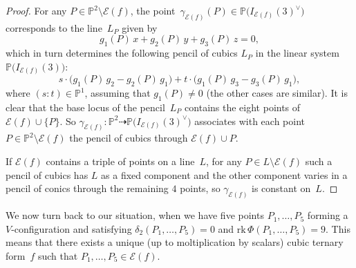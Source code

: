 \documentclass[a4paper, 11pt, reqno]{amsart}
\theoremstyle{plain}
\theoremstyle{definition}
\newcommand{\p}{\mathbb{P}}
\newcommand{\rk}{\ensuremath{\mathrm{rk}}}
\newcommand{\Eig}[1]{\mathcal{E}\!\left( {#1} \right)}
\begin{document}
\begin{proof}
%
For any $P \in \p^2 \setminus \Eig{f}$, the point~$\gamma_{\Eig{f}} (P)\in \p \bigl(I_{\Eig{f}}(3)^{\vee}\bigr)$ corresponds to the line~$L_P$ given by
\[
  g_1 (P) \, x + g_2(P) \, y + g_3(P) \, z = 0,
\]
%
which in turn determines the following
pencil of cubics $L_P$ in the linear system $\p \bigl(I_{\Eig{f}}(3)\bigr)$:
%
\[
  s \cdot \bigl( g_1(P) \, g_2 - g_2(P) \, g_1 \bigr) + t \cdot \bigl( g_1(P) \, g_3 - g_3(P) \, g_1 \bigr),
\]
%
where $(s: t) \in \p^1$, assuming that $g_1(P) \neq 0$ (the other cases are similar).
It is clear that the base locus of the pencil~$L_P$ contains the eight points of~$\Eig{f} \cup \{P\}$.
So $\gamma_{\Eig{f}} \colon \p^2 \dasharrow \p \bigl( I_{\Eig{f}}(3)^\vee \bigr)$
associates with each point $P \in \p^2 \setminus \Eig{f}$ the pencil of cubics through $\Eig{f} \cup P$.

If $\Eig{f}$ contains a triple of points on a line~$L$, for any $P \in L \setminus \Eig{f}$ such a pencil of cubics has $L$ as a fixed component and the other component varies in a pencil of conics through the remaining $4$ points, so $\gamma_{\Eig{f}}$ is constant on~$L$.
\end{proof}



We now turn back to our situation, when we have five points $P_1, \dots, P_5$ forming a $V$-configuration and satisfying $\delta_2(P_1, \dots, P_5)=0$ and $\rk \, \Phi(P_1, \dotsc, P_5) = 9$. This means that there exists a unique (up to moltiplication by scalars) cubic ternary form~$f$ such that $P_1, \dotsc, P_5 \in \Eig{f}$.
\end{document}
